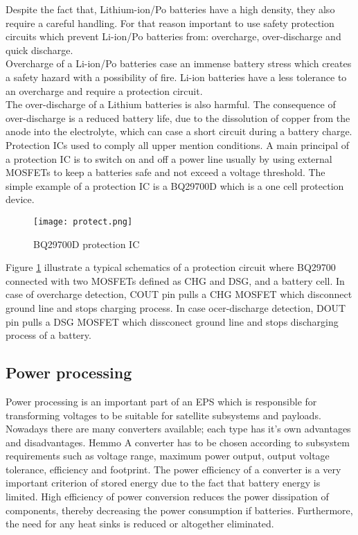 Despite the fact that, Lithium-ion/Po batteries have a high density, they also require a careful handling. For that reason important to use safety protection circuits which prevent Li-ion/Po batteries from: overcharge, over-discharge and quick discharge.\\
\cite{16} Overcharge of a Li-ion/Po batteries case an immense battery stress which creates a safety hazard with a possibility of fire. Li-ion batteries have a less tolerance to an overcharge and require a protection circuit.\\
The over-discharge of a Lithium batteries is also harmful. The consequence of over-discharge is a reduced battery life, due to the dissolution of copper from the anode into the electrolyte, which can case a short circuit during a battery charge.\\
Protection ICs used to comply all upper mention conditions. A main principal of a protection IC is to switch on and off a power line usually by using external MOSFETs to keep a batteries safe and not exceed a voltage threshold. The simple example of a protection IC is a BQ29700D which is a one cell protection device. 

\begin{figure}[h]
	\centering
	\texttt{[image: protect.png]}
	\caption{ BQ29700D protection IC \cite{17}}
	\label{fig: EPS1}
\end{figure}

Figure \ref{fig: EPS1} illustrate a typical schematics of a protection circuit where BQ29700 connected with two MOSFETs defined as CHG and DSG, and a battery cell. In case of overcharge detection, COUT pin pulls a CHG MOSFET which disconnect ground line and stops charging process. In case ocer-discharge detection, DOUT pin pulls a DSG MOSFET which dissconect ground line and stops discharging process of a battery.

\subsection{Power processing \label{sec:tech}}

Power processing is an important part of an EPS which is responsible for transforming voltages to be suitable for satellite subsystems and payloads. Nowadays there are many converters available; each type has it's own advantages and disadvantages. Hemmo\cite{18} A converter has to be chosen according to subsystem requirements such as voltage range, maximum power output, output voltage tolerance, efficiency and footprint. The power efficiency of a converter is a very important criterion of stored energy due to the fact that battery energy is limited. High efficiency of  power conversion reduces the power dissipation of  components, thereby decreasing the power consumption if batteries. Furthermore, the need for any heat sinks is reduced or altogether eliminated. 

